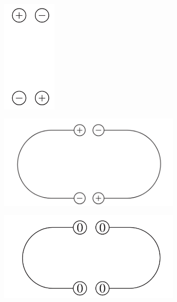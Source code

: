 \documentclass[a4paper,12pt]{report}
\begin{document}
	\begin{figure}[htbp]
		\centering
		
		\begin{subfigure}[b]{0.35\textwidth}
			\centering
			\includegraphics[width=0.3\textwidth]{uni1}
			\caption[]{\label{uni1}}
		\end{subfigure}
		\hfill
		\begin{subfigure}[b]{0.4\textwidth}
			\centering
			\includegraphics[width=\textwidth]{uni2}	
			\caption[]{\label{uni2}}
		\end{subfigure}
		
		\begin{subfigure}[b]{0.4\textwidth}
			\centering
			\includegraphics[width=\textwidth]{uni3}	
			\caption[]{\label{uni3}}
		\end{subfigure}
		
		\caption[]{\label{uni}}
	\end{figure}
	
\end{document}
